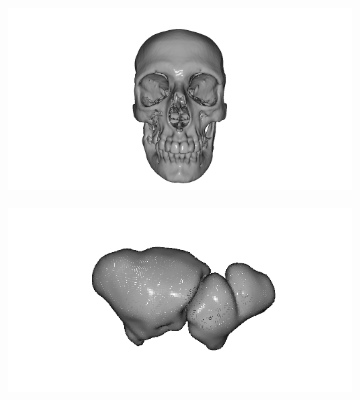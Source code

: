 \begin{figure}[htp]
  \begin{subfigure}[b]{0.49\textwidth}
  \centering 
  \includegraphics[width=\textwidth]{imagenes/chapter4/Craneo12018377.png}
  \end{subfigure}
  \begin{subfigure}[b]{0.49\textwidth}
  \centering 
  \includegraphics[width=\textwidth]{imagenes/chapter4/SenoFrontal100205.png}
  \end{subfigure}


\end{figure}
